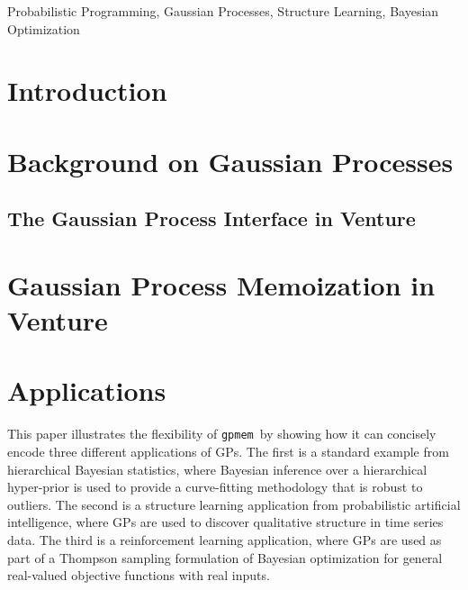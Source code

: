 \documentclass[twoside,11pt]{article}
\newcommand{\gpmem}{\texttt{gpmem}}
\newcommand{\myparagraph}[1]{\paragraph{#1}\mbox{}\\}
\begin{document}
\begin{keywords}
  Probabilistic Programming, Gaussian Processes, Structure Learning, Bayesian Optimization
\end{keywords}


\section{Introduction}

%
%

%
\setcounter{figure}{0}
\section{Background on Gaussian Processes}


%
\subsection{The Gaussian Process Interface in Venture}

\section{Gaussian Process Memoization in Venture}


\section{Applications}
This paper illustrates the flexibility of \gpmem\ by showing how it can concisely encode three different applications of \ac{GP}s.
The first is a standard example from hierarchical Bayesian statistics, where Bayesian inference over a hierarchical hyper-prior is used to provide a curve-fitting methodology that is robust to outliers.
The second is a structure learning application from probabilistic artificial intelligence, where \ac{GP}s are used to discover qualitative structure in time series data.
The third is a reinforcement learning application, where \ac{GP}s are used as part of a Thompson sampling formulation of Bayesian optimization for general real-valued objective functions with real inputs.
\end{document}
